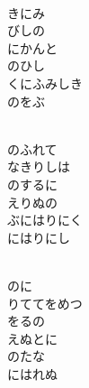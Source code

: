 \documentclass[10pt,b5j]{tarticle} %
\begin{document}
\begin{enumerate}
\begin{minipage}[c]{\blocksize}
        \vspace{\linespace}
        \item~\\
        きにみ\\
        びしの\\
        にかんと\\
        のひし\\
        くにふみしき\\
        のをぶ
        
        \vspace{\linespace}
        \item~\\
        のふれて\\
        なきりしは\\
        のするに\\
        えりぬの\\
        ぶにはりにく\\
        にはりにし
        
        \vspace{\linespace}
        \item~\\
        のに\\
        りててをめつ\\
        をるの\\
        えぬとに\\
        のたな\\
        にはれぬ
    
    \end{minipage}
\end{enumerate} %
\end{document}
